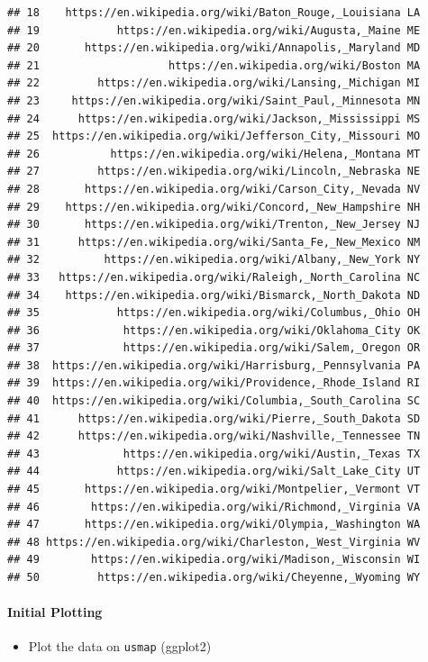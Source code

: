 \documentclass[
]{article}
\providecommand{\tightlist}{%
  \setlength{\itemsep}{0pt}\setlength{\parskip}{0pt}}
\begin{document}
\begin{verbatim}
## 18    https://en.wikipedia.org/wiki/Baton_Rouge,_Louisiana LA
## 19            https://en.wikipedia.org/wiki/Augusta,_Maine ME
## 20       https://en.wikipedia.org/wiki/Annapolis,_Maryland MD
## 21                    https://en.wikipedia.org/wiki/Boston MA
## 22         https://en.wikipedia.org/wiki/Lansing,_Michigan MI
## 23     https://en.wikipedia.org/wiki/Saint_Paul,_Minnesota MN
## 24      https://en.wikipedia.org/wiki/Jackson,_Mississippi MS
## 25  https://en.wikipedia.org/wiki/Jefferson_City,_Missouri MO
## 26           https://en.wikipedia.org/wiki/Helena,_Montana MT
## 27         https://en.wikipedia.org/wiki/Lincoln,_Nebraska NE
## 28       https://en.wikipedia.org/wiki/Carson_City,_Nevada NV
## 29    https://en.wikipedia.org/wiki/Concord,_New_Hampshire NH
## 30       https://en.wikipedia.org/wiki/Trenton,_New_Jersey NJ
## 31      https://en.wikipedia.org/wiki/Santa_Fe,_New_Mexico NM
## 32          https://en.wikipedia.org/wiki/Albany,_New_York NY
## 33   https://en.wikipedia.org/wiki/Raleigh,_North_Carolina NC
## 34    https://en.wikipedia.org/wiki/Bismarck,_North_Dakota ND
## 35            https://en.wikipedia.org/wiki/Columbus,_Ohio OH
## 36             https://en.wikipedia.org/wiki/Oklahoma_City OK
## 37             https://en.wikipedia.org/wiki/Salem,_Oregon OR
## 38  https://en.wikipedia.org/wiki/Harrisburg,_Pennsylvania PA
## 39  https://en.wikipedia.org/wiki/Providence,_Rhode_Island RI
## 40  https://en.wikipedia.org/wiki/Columbia,_South_Carolina SC
## 41      https://en.wikipedia.org/wiki/Pierre,_South_Dakota SD
## 42      https://en.wikipedia.org/wiki/Nashville,_Tennessee TN
## 43             https://en.wikipedia.org/wiki/Austin,_Texas TX
## 44            https://en.wikipedia.org/wiki/Salt_Lake_City UT
## 45       https://en.wikipedia.org/wiki/Montpelier,_Vermont VT
## 46        https://en.wikipedia.org/wiki/Richmond,_Virginia VA
## 47       https://en.wikipedia.org/wiki/Olympia,_Washington WA
## 48 https://en.wikipedia.org/wiki/Charleston,_West_Virginia WV
## 49        https://en.wikipedia.org/wiki/Madison,_Wisconsin WI
## 50         https://en.wikipedia.org/wiki/Cheyenne,_Wyoming WY
\end{verbatim}

\hypertarget{initial-plotting}{%
\paragraph{Initial Plotting}\label{initial-plotting}}

\begin{itemize}
\tightlist
\item
  Plot the data on \texttt{usmap} (ggplot2)
\end{itemize}
\end{document}

